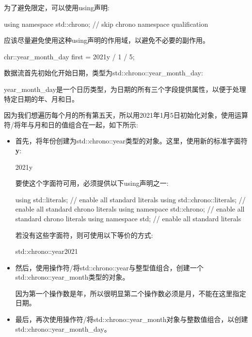 为了避免限定，可以使用using声明:

\begin{cpp}
using namespace std::chrono; // skip chrono namespace qualification
\end{cpp}

应该尽量避免使用这种using声明的作用域，以避免不必要的副作用。


\begin{cpp}
chr::year_month_day first = 2021y / 1 / 5;
\end{cpp}

数据流首先初始化开始日期，类型为std::chrono::year\_month\_day:

year\_month\_day是一个日历类型，为日期的所有三个字段提供属性，以便于处理特定日期的年、月和日。

因为我们想遍历每个月的所有第五天，所以用2021年1月5日初始化对象，使用运算符/将年与月和日的值组合在一起，如下所示:

\begin{itemize}
\item 
首先，将年份创建为std::chrono::year类型的对象。这里，使用新的标准字面符\textbf{y}:

\begin{cpp}
2021y
\end{cpp}

要使这个字面符可用，必须提供以下using声明之一:

\begin{cpp}
using std::literals; // enable all standard literals
using std::chrono::literals; // enable all standard chrono literals
using namespace std::chrono; // enable all standard chrono literals
using namespace std; // enable all standard literals
\end{cpp}

若没有这些字面符，则可使用以下等价的方式:

\begin{cpp}
std::chrono::year{2021}
\end{cpp}

\item
然后，使用操作符/将std::chrono::year与整型值组合，创建一个std::chrono::year\_month类型的对象。

因为第一个操作数是年，所以很明显第二个操作数必须是月，不能在这里指定日期。

\item
最后，再次使用操作符/将std::chrono::year\_month对象与整数值组合，以创建std::chrono::year\_month\_day。
\end{itemize}

